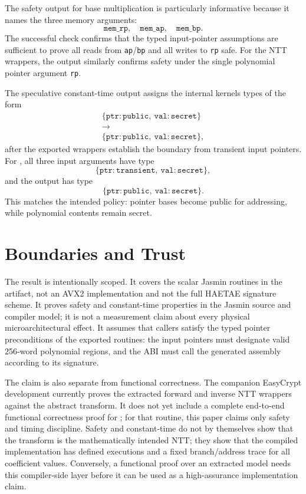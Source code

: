 \documentclass[10pt,twocolumn]{article}
\newcommand{\haetae}{HAETAE}
\newcommand{\jasmin}{Jasmin}
\newcommand{\ct}{constant-time}
\begin{document}
The safety output for base multiplication is particularly informative because
it names the three memory arguments:
\[
  \texttt{mem\_rp},\quad \texttt{mem\_ap},\quad \texttt{mem\_bp}.
\]
The successful check confirms that the typed input-pointer assumptions are
sufficient to prove all reads from \texttt{ap}/\texttt{bp} and all writes to
\texttt{rp} safe.  For the NTT wrappers, the output similarly confirms safety
under the single polynomial pointer argument \texttt{rp}.

The speculative \ct{} output assigns the internal kernels types of the form
\[
  \begin{array}{c}
  \{\texttt{ptr}:\texttt{public},\ \texttt{val}:\texttt{secret}\}\\
  \to\\
  \{\texttt{ptr}:\texttt{public},\ \texttt{val}:\texttt{secret}\},
  \end{array}
\]
after the exported wrappers establish the boundary from transient input
pointers.  For , all three input arguments have type
\[
  \{\texttt{ptr}:\texttt{transient},\ \texttt{val}:\texttt{secret}\},
\]
and the output has type
\[
  \{\texttt{ptr}:\texttt{public},\ \texttt{val}:\texttt{secret}\}.
\]
This matches the intended policy: pointer bases become public for addressing,
while polynomial contents remain secret.

\section{Boundaries and Trust}

The result is intentionally scoped.  It covers the scalar \jasmin{} routines in
the artifact, not an AVX2 implementation and not the full \haetae{} signature
scheme.  It proves safety and \ct{} properties in the \jasmin{} source and
compiler model; it is not a measurement claim about every physical
microarchitectural effect.  It assumes that callers satisfy the typed pointer
preconditions of the exported routines: the input pointers must designate valid
256-word polynomial regions, and the ABI must call the generated assembly
according to its signature.

The claim is also separate from functional correctness.  The companion
EasyCrypt development currently proves the extracted forward and inverse NTT
wrappers against the abstract transform.  It does not yet include a complete
end-to-end functional correctness proof for ; for that
routine, this paper claims only safety and timing discipline.  Safety and
\ct{} do not by themselves show that the transform is the mathematically
intended NTT; they show that the compiled implementation has defined executions
and a fixed branch/address trace for all coefficient values.  Conversely, a
functional proof over an extracted model needs this compiler-side layer before
it can be used as a high-assurance implementation claim.
\end{document}
